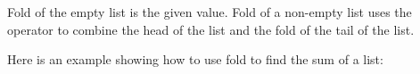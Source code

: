 \begin{fence}
\begin{code}%
\>[0]\AgdaSpace{}%
\AgdaSymbol{:}\AgdaSpace{}%
\AgdaSpace{}%
\AgdaSymbol{\{}\AgdaSpace{}%
\AgdaSpace{}%
\AgdaSymbol{:}\AgdaSpace{}%
\AgdaSymbol{\}}\AgdaSpace{}%
\AgdaSpace{}%
\AgdaSymbol{(}\AgdaSpace{}%
\AgdaSpace{}%
\AgdaSpace{}%
\AgdaSpace{}%
\AgdaSymbol{)}\AgdaSpace{}%
\AgdaSpace{}%
\AgdaSpace{}%
\AgdaSpace{}%
\AgdaSpace{}%
\AgdaSpace{}%
\AgdaSpace{}%
\<%
\\
\>[0]\AgdaSpace{}%
\AgdaSpace{}%
\AgdaSpace{}%
\AgdaInductiveConstructor{[]}%
\>[22]\AgdaSymbol{=}%
\>[25]\<%
\\
\>[0]\AgdaSpace{}%
\AgdaSpace{}%
\AgdaSpace{}%
\AgdaSymbol{(}\AgdaSpace{}%
\AgdaSpace{}%
\AgdaSymbol{)}%
\>[22]\AgdaSymbol{=}%
\>[25]\AgdaSpace{}%
\AgdaSpace{}%
\AgdaSpace{}%
\AgdaSpace{}%
\AgdaSpace{}%
\<%
\end{code}
\end{fence}

Fold of the empty list is the given value. Fold of a non-empty list uses
the operator to combine the head of the list and the fold of the tail of
the list.

Here is an example showing how to use fold to find the sum of a list:

